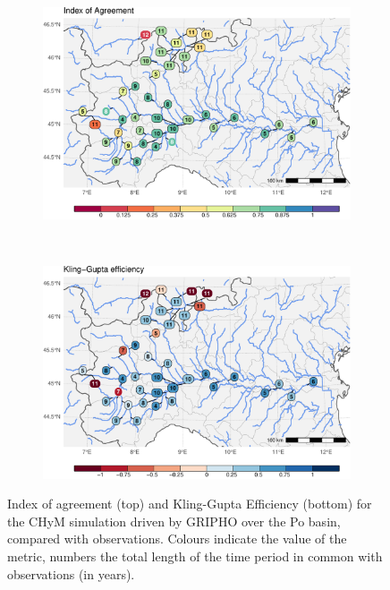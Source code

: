 \begin{figure}
    \centering
    \begin{subfigure}{0.8\textwidth}
        \includegraphics[width=\textwidth]{figures/valid_Q/metrics/intdb-fil-nc_reg1_22_d}
    \end{subfigure}\\
    \begin{subfigure}{0.8\textwidth}
        \includegraphics[width=\textwidth]{figures/valid_Q/metrics/intdb-fil-nc_reg1_22_KGE}
    \end{subfigure}
    \decoRule
    \caption[CHyM (GRIPHO) performance metrics for the Po basin]{
        Index of agreement (top) and Kling-Gupta Efficiency (bottom) for the CHyM simulation driven by GRIPHO over the Po basin, compared with observations. Colours indicate the value of the metric, numbers the total length of the time period in common with observations (in years).
    }\label{fig:valid_q_gripho_reg1}
\end{figure}
